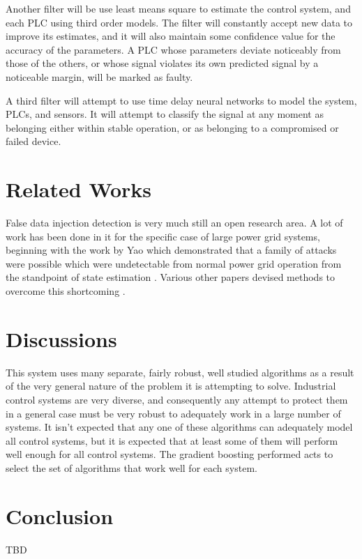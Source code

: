\documentclass[10pt,twocolumn]{IEEEtran}
\begin{document}
Another filter will be use least means square to estimate the control system, and each PLC using third order models.
The filter will constantly accept new data to improve its estimates, and it will also maintain some confidence value for the accuracy of the parameters.
A PLC whose parameters deviate noticeably from those of the others, or whose signal violates its own predicted signal by a noticeable margin, will be marked as faulty.

A third filter will attempt to use time delay neural networks to model the system, PLCs, and sensors.
It will attempt to classify the signal at any moment as belonging either within stable operation, or as belonging to a compromised or failed device.

\section{Related Works} \label{sec:related}
False data injection detection is very much still an open research area.
A lot of work has been done in it for the specific case of large power grid systems, beginning with the work by Yao which demonstrated that a family of attacks were possible which were undetectable from normal power grid operation from the standpoint of state estimation \cite{liu2011false}.
Various other papers devised methods to overcome this shortcoming \cite{bobba2010detecting}.

\section{Discussions}\label{sec:discussion}
This system uses many separate, fairly robust, well studied algorithms as a result of the very general nature of the problem it is attempting to solve.
Industrial control systems are very diverse, and consequently any attempt to protect them in a general case must be very robust to adequately work in a large number of systems.
It isn't expected that any one of these algorithms can adequately model all control systems, but it is expected that at least some of them will perform well enough for all control systems.
The gradient boosting performed acts to select the set of algorithms that work well for each system.

\section{Conclusion} \label{sec:conclusion}
TBD

\vspace{-0.08in}
\raggedright


\end{document}
